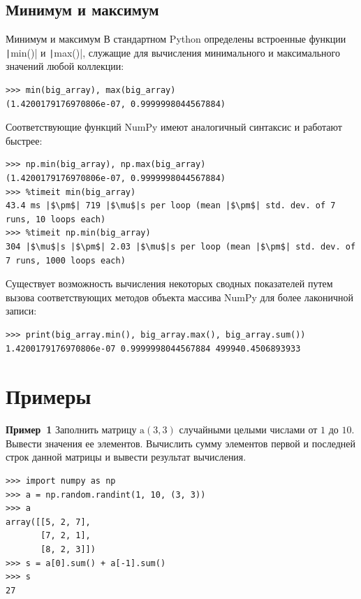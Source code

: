 \documentclass[aspectratio=169, mathserif]{beamer}%
\begin{document}
\subsection{Минимум и максимум}
\begin{frame}[fragile]{Минимум и максимум}
\scriptsize
В стандартном Python определены встроенные функции \texttt|min()| и \texttt|max()|, служащие для вычисления минимального и максимального значений любой коллекции:

\begin{verbatim}
>>> min(big_array), max(big_array)
(1.4200179176970806e-07, 0.9999998044567884)
\end{verbatim}

Соответствующие функций NumPy имеют аналогичный синтаксис и работают быстрее:

\begin{verbatim}
>>> np.min(big_array), np.max(big_array)
(1.4200179176970806e-07, 0.9999998044567884)
>>> %timeit min(big_array)
43.4 ms |$\pm$| 719 |$\mu$|s per loop (mean |$\pm$| std. dev. of 7 runs, 10 loops each)
>>> %timeit np.min(big_array)
304 |$\mu$|s |$\pm$| 2.03 |$\mu$|s per loop (mean |$\pm$| std. dev. of 7 runs, 1000 loops each)
\end{verbatim}

Существует возможность вычисления некоторых сводных показателей путем вызова соответствующих методов объекта массива NumPy для более лаконичной записи:

\begin{verbatim}
>>> print(big_array.min(), big_array.max(), big_array.sum())
1.4200179176970806e-07 0.9999998044567884 499940.4506893933
\end{verbatim}
\vfill
\end{frame}

\section{Примеры}
\sectionframe


\begin{frame}[fragile]{\textcolor{tpugreen}{\textbf{Пример~1}}}
\scriptsize
Заполнить матрицу $\mathrm{a}(3, 3)$ случайными целыми числами от $1$ до $10$. Вывести значения ее элементов. Вычислить сумму элементов первой и последней строк данной матрицы и вывести результат вычисления.
\vfill
\begin{verbatim}
>>> import numpy as np
>>> a = np.random.randint(1, 10, (3, 3))
>>> a
array([[5, 2, 7],
       [7, 2, 1],
       [8, 2, 3]])
>>> s = a[0].sum() + a[-1].sum()
>>> s
27
\end{verbatim}
\vfill
\end{frame}
\end{document}
